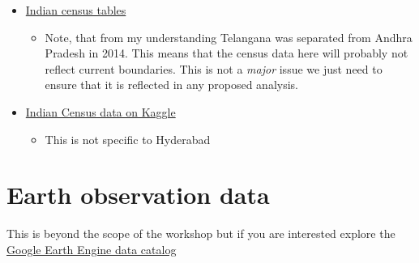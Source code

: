 \documentclass[
  letterpaper,
]{scrbook}
\providecommand{\tightlist}{%
  \setlength{\itemsep}{0pt}\setlength{\parskip}{0pt}}\usepackage{longtable,booktabs,array}
\begin{document}
\begin{itemize}
\tightlist
\item
  \href{https://censusindia.gov.in/census.website/data/census-tables}{Indian
  census tables}

  \begin{itemize}
  \tightlist
  \item
    Note, that from my understanding Telangana was separated from Andhra
    Pradesh in 2014. This means that the census data here will probably
    not reflect current boundaries. This is not a \emph{major} issue we
    just need to ensure that it is reflected in any proposed analysis.
  \end{itemize}
\item
  \href{https://www.kaggle.com/datasets/danofer/india-census?select=india-districts-census-2011.csv}{Indian
  Census data on Kaggle}

  \begin{itemize}
  \tightlist
  \item
    This is not specific to Hyderabad
  \end{itemize}
\end{itemize}

\hypertarget{earth-observation-data}{%
\section{Earth observation data}\label{earth-observation-data}}

This is beyond the scope of the workshop but if you are interested
explore the
\href{https://developers.google.com/earth-engine/datasets}{Google Earth
Engine data catalog}


\backmatter
\end{document}
